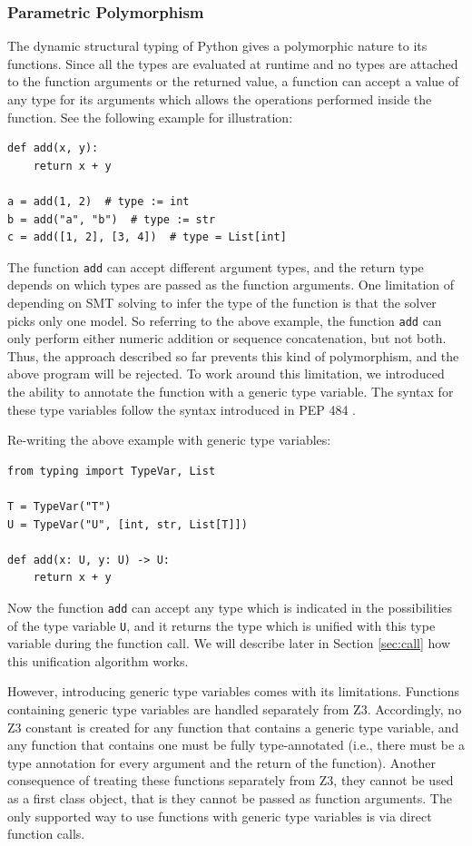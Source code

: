 \subsubsection{Parametric Polymorphism}
The dynamic structural typing of Python gives a polymorphic nature to its functions. Since all the types are evaluated at runtime and no types are attached to the function arguments or the returned value, a function can accept a value of any type for its arguments which allows the operations performed inside the function. See the following example for illustration:
\begin{lstlisting}
def add(x, y):
	return x + y
	
a = add(1, 2)  # type := int
b = add("a", "b")  # type := str
c = add([1, 2], [3, 4])  # type = List[int]
\end{lstlisting}
The function \lstinline|add| can accept different argument types, and the return type depends on which types are passed as the function arguments. One limitation of depending on SMT solving to infer the type of the function is that the solver picks only one model. So referring to the above example, the function \lstinline|add| can only perform either numeric addition or sequence concatenation, but not both. Thus, the approach described so far prevents this kind of polymorphism, and the above program will be rejected. To work around this limitation, we introduced the ability to annotate the function with a generic type variable. The syntax for these type variables follow the syntax introduced in PEP 484 \cite{484}.

Re-writing the above example with generic type variables:

\begin{lstlisting}
from typing import TypeVar, List

T = TypeVar("T")
U = TypeVar("U", [int, str, List[T]])

def add(x: U, y: U) -> U:
	return x + y
\end{lstlisting}
Now the function \lstinline|add| can accept any type which is indicated in the possibilities of the type variable \lstinline|U|, and it returns the type which is unified with this type variable during the function call. We will describe later in Section \ref{sec:call} how this unification algorithm works.

However, introducing generic type variables comes with its limitations. Functions containing generic type variables are handled separately from Z3. Accordingly, no Z3 constant is created for any function that contains a generic type variable, and any function that contains one must be fully type-annotated (i.e., there must be a type annotation for every argument and the return of the function). Another consequence of treating these functions separately from Z3, they cannot be used as a first class object, that is they cannot be passed as function arguments. The only supported way to use functions with generic type variables is via direct function calls.
